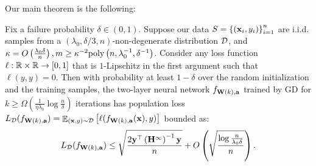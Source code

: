 Our main theorem is the following:
\begin{thm}\label{thm:main_generalization}
	Fix %
	a failure probability $\delta \in (0, 1)$.
	Suppose our data $S = \left\{(\mathbf{x}_i,  y_i)\right\}_{i=1}^n$ are i.i.d. samples from a $(\lambda_0, \delta/3, n)$-non-degenerate distribution $\mathcal{D}$, and $\kappa = O\left( \frac{ \lambda_0 \delta}{ n} \right), m\ge \kappa^{-2} \mathrm{poly}\left(n, \lambda_0^{-1}, \delta^{-1} \right)  $.
	Consider any loss function $\ell: \mathbb{R}\times\mathbb{R} \to [0, 1]$ that is $1$-Lipschitz in the first argument such that $\ell(y, y)=0$.
	Then with probability at least $1-\delta$ over the random initialization and the training samples, the two-layer neural network $f_{\mathbf{W}(k), \mathbf{a}}$ trained by GD for $k\ge \Omega\left( \frac{1}{\eta\lambda_0} \log\frac{n}{\delta} \right)$ iterations has population loss $L_{\mathcal{D}}(f_{\mathbf{W}(k), \mathbf{a}}) = \mathop\mathbb{E}_{(\mathbf{x}, y)\sim\mathcal{D}}\left[ \ell(f_{\mathbf{W}(k), \mathbf{a}}(\mathbf{x}), y) \right]$ bounded as:
	\begin{equation} \label{eqn:main_generalization}
	L_{\mathcal{D}}(f_{\mathbf{W}(k), \mathbf{a}}) \le \sqrt{\frac{2\mathbf{y}^\top \left(\mathbf{H}^{\infty}\right)^{-1}\mathbf{y}}{n}}  + O\left( \sqrt{\frac{\log\frac{n}{\lambda_0\delta}}{n}} \right) .
	\end{equation}
\end{thm}


